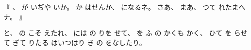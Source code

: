 『
、
%
が
いぢや
いか。
%
か
はせんか、
%
になるネ。
%
さあ、
%
まあ、
%
つて
れたまへナ。
』

と、
%
の
こそ
えたれ、
%
には
の
りを
せて、
%
を
ふ
の
かくも
かく、
%
ひて
を
らせて
ぎて
りたる
はいつはり
き
の
をなしたり。

